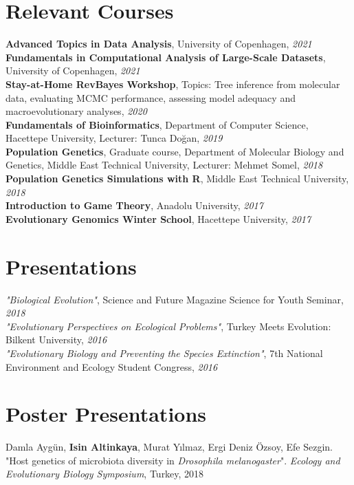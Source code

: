 \documentclass[letterpaper,10.5pt]{article}
\begin{document}
\section{Relevant Courses}
\textbf{Advanced Topics in Data Analysis}, University of Copenhagen, \textit{2021} \\
\textbf{Fundamentals in Computational Analysis of Large-Scale Datasets}, University of Copenhagen, \textit{2021} \\
\textbf{Stay-at-Home RevBayes Workshop}, Topics: Tree inference from molecular data, evaluating MCMC performance, assessing model adequacy and macroevolutionary analyses, \textit{2020} \\
\textbf{Fundamentals of Bioinformatics}, Department of Computer Science, Hacettepe University, Lecturer: Tunca Do\u{g}an,  \textit{2019} \\
\textbf{Population Genetics}, Graduate course, Department of Molecular Biology and Genetics, Middle East Technical University, Lecturer: Mehmet Somel, \textit{2018} \\
\textbf{Population Genetics Simulations with R}, Middle East Technical University, \textit{2018} \\
\textbf{Introduction to Game Theory}, Anadolu University, \textit{2017} \\
\textbf{Evolutionary Genomics Winter School}, Hacettepe University, \textit{2017} 

\section{Presentations}
{\textit{"Biological Evolution"}}, Science and Future Magazine Science for Youth Seminar,  \textit{2018} \\
{\textit{"Evolutionary Perspectives on Ecological Problems"}}, Turkey Meets Evolution: Bilkent University,  \textit{2016} \\
{\textit{"Evolutionary Biology and Preventing the Species Extinction"}}, 7th National Environment and Ecology Student Congress,  \textit{2016}

\section{Poster Presentations}
Damla Aygün, \textbf{Isin Altinkaya}, Murat Y{\i}lmaz, Ergi Deniz \"{O}zsoy, Efe Sezgin. "Host genetics of microbiota diversity in \textit{Drosophila melanogaster}". \textit{Ecology and Evolutionary Biology Symposium}, Turkey, 2018 \\
\end{document}
